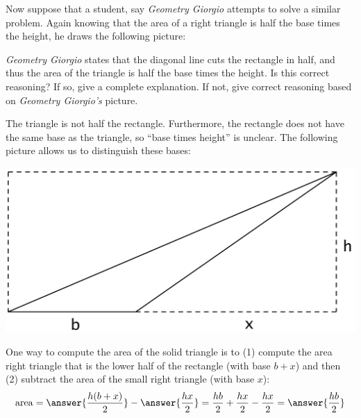 \documentclass[nooutcomes]{ximera}
\begin{document}
\begin{problem}
Now suppose that a student, say \textit{Geometry Giorgio} attempts to
solve a similar problem. Again knowing that the area of a right
triangle is half the base times the height, he draws the following
picture:
\begin{image}
\end{image}
\textit{Geometry Giorgio} states that the diagonal line cuts the
rectangle in half, and thus the area of the triangle is half the base
times the height. Is this correct reasoning? If so, give a complete
explanation. If not, give correct reasoning based on \textit{Geometry
  Giorgio's} picture.
\begin{freeResponse}
\begin{hint}
The triangle is not half the rectangle.  Furthermore, the rectangle does not have the same base as the triangle, so ``base times height'' is unclear.  The following picture allows us to distinguish these bases:  
\begin{image}
\includegraphics{triangleArea.png}
\end{image}
One way to compute the area of the solid triangle is to (1) compute the area right triangle that is the lower half of the rectangle (with base $b+x$) and then (2) subtract the area of the small right triangle (with base $x$): 
\[
\mathrm{area} =  \answer{\frac{h(b+x)}{2}} - \answer{\frac{hx}{2}}= \frac{hb}{2} + \frac{hx}{2} - \frac{hx}{2} = \answer{\frac{hb}{2}}
\]
\end{hint}
\end{freeResponse}
\end{problem}
\end{document}
